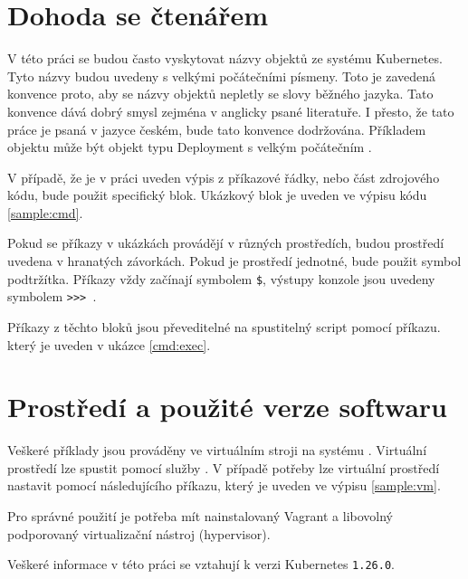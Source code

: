 \section{Dohoda se čtenářem}
V této práci se budou často vyskytovat názvy objektů ze systému Kubernetes. Tyto názvy budou uvedeny s velkými počátečními písmeny. Toto je zavedená konvence proto, aby se názvy objektů nepletly se slovy běžného jazyka. Tato konvence dává dobrý smysl zejména v anglicky psané literatuře. I přesto, že tato práce je psaná v jazyce českém, bude tato konvence dodržována. Příkladem objektu může být objekt typu Deployment s velkým počátečním .

V případě, že je v práci uveden výpis z příkazové řádky, nebo část zdrojového kódu, bude použit specifický blok. Ukázkový blok je uveden ve výpisu kódu \ref{sample:cmd}.

Pokud se příkazy v ukázkách provádějí v různých prostředích, budou prostředí uvedena v hranatých závorkách. Pokud je prostředí jednotné, bude použit symbol podtržítka. Příkazy vždy začínají symbolem \verb|$|, výstupy konzole jsou uvedeny symbolem \verb|>>> |.


Příkazy z těchto bloků jsou převeditelné na spustitelný script pomocí příkazu. který je uveden v ukázce \ref{cmd:exec}.


\section{Prostředí a použité verze softwaru}
Veškeré příklady jsou prováděny ve virtuálním stroji na systému . Virtuální prostředí lze spustit pomocí služby . V případě potřeby lze virtuální prostředí nastavit pomocí následujícího příkazu, který je uveden ve výpisu \ref{sample:vm}.


Pro správné použití je potřeba mít nainstalovaný Vagrant a libovolný podporovaný virtualizační nástroj (hypervisor).

Veškeré informace v této práci se vztahují k verzi Kubernetes \verb|1.26.0|.